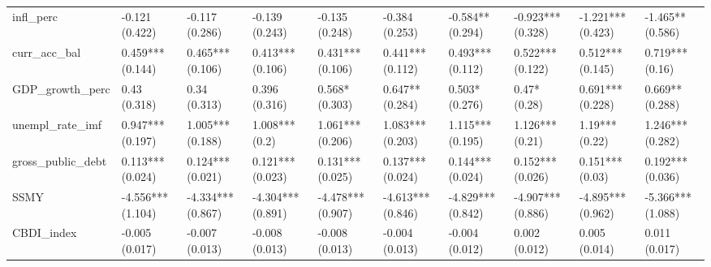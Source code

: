 \begin{table}[H]
\begin{adjustbox}{totalheight=3in, width=\columnwidth }
\begin{subtable}[c]{1.1\textwidth}
{\begin{tabular}{llllllllll}
  infl\_perc & -0.121 (0.422) & -0.117 (0.286) & -0.139 (0.243) & -0.135 (0.248) & -0.384 (0.253) & -0.584** (0.294) & -0.923*** (0.328) & -1.221*** (0.423) & -1.465** (0.586) \\ 
  curr\_acc\_bal & 0.459*** (0.144) & 0.465*** (0.106) & 0.413*** (0.106) & 0.431*** (0.106) & 0.441*** (0.112) & 0.493*** (0.112) & 0.522*** (0.122) & 0.512*** (0.145) & 0.719*** (0.16) \\ 
  GDP\_growth\_perc & 0.43 (0.318) & 0.34 (0.313) & 0.396 (0.316) & 0.568* (0.303) & 0.647** (0.284) & 0.503* (0.276) & 0.47* (0.28) & 0.691*** (0.228) & 0.669** (0.288) \\ 
  unempl\_rate\_imf & 0.947*** (0.197) & 1.005*** (0.188) & 1.008*** (0.2) & 1.061*** (0.206) & 1.083*** (0.203) & 1.115*** (0.195) & 1.126*** (0.21) & 1.19*** (0.22) & 1.246*** (0.282) \\ 
  gross\_public\_debt & 0.113*** (0.024) & 0.124*** (0.021) & 0.121*** (0.023) & 0.131*** (0.025) & 0.137*** (0.024) & 0.144*** (0.024) & 0.152*** (0.026) & 0.151*** (0.03) & 0.192*** (0.036) \\ 
  SSMY & -4.556*** (1.104) & -4.334*** (0.867) & -4.304*** (0.891) & -4.478*** (0.907) & -4.613*** (0.846) & -4.829*** (0.842) & -4.907*** (0.886) & -4.895*** (0.962) & -5.366*** (1.088) \\ 
  CBDI\_index & -0.005 (0.017) & -0.007 (0.013) & -0.008 (0.013) & -0.008 (0.013) & -0.004 (0.013) & -0.004 (0.012) & 0.002 (0.012) & 0.005 (0.014) & 0.011 (0.017) \\ 
   \bottomrule
\end{tabular}}



\end{subtable}
\end{adjustbox}
\end{table}
